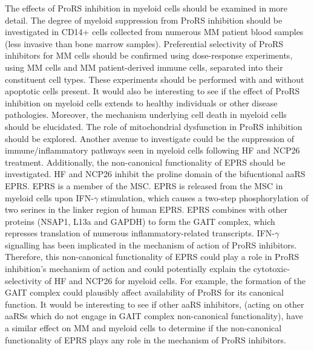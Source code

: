 The effects of ProRS inhibition in myeloid cells should be examined in more detail.
The degree of myeloid suppression from ProRS inhibition should be investigated in CD14+ cells collected from numerous MM patient blood samples (less invasive than bone marrow samples).
Preferential selectivity of ProRS inhibitors for MM cells should be confirmed using dose-response experiments, using MM cells and MM patient-derived immune cells, separated into their constituent cell types.
These experiments should be performed with and without apoptotic cells present.
It would also be interesting to see if the effect of ProRS inhibition on myeloid cells extends to healthy individuals or other disease pathologies.
Moreover, the mechanism underlying cell death in myeloid cells should be elucidated.
The role of mitochondrial dysfunction in ProRS inhibition should be explored.
Another avenue to investigate could be the suppression of immune/inflammatory pathways seen in myeloid cells following HF and NCP26 treatment.
Additionally, the non-canonical functionality of EPRS should be investigated.
HF and NCP26 inhibit the proline domain of the bifucntional aaRS EPRS\@.
EPRS is a member of the MSC\@.
EPRS is released from the MSC in myeloid cells upon IFN-$\gamma$ stimulation, which causes a two-step phosphorylation of two serines in the linker region of human EPRS\cite{arif2009two}.
EPRS combines with other proteins (NSAP1, L13a and GAPDH) to form the GAIT complex, which represses translation of numerous inflammatory-related transcripts\cite{arif2018gait}.
IFN-$\gamma$ signalling has been implicated in the mechanism of action of ProRS inhibitors\cite{cheng2012halofugine}.
Therefore, this non-canonical functionality of EPRS could play a role in ProRS inhibition's mechanism of action and could potentially explain the cytotoxic-selectivity of HF and NCP26 for myeloid cells.
For example, the formation of the GAIT complex could plausibly affect availability of ProRS for its canonical function.
It would be interesting to see if other aaRS inhibitors, (acting on other aaRSs which do not engage in GAIT complex non-canonical functionality), have a similar effect on MM and myeloid cells to determine if the non-canonical functionality of EPRS plays any role in the mechanism of ProRS inhibitors.

